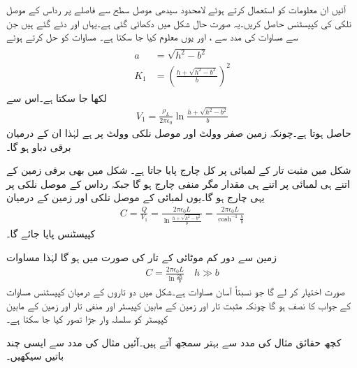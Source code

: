 آئیں ان معلومات کو استعمال کرتے ہوئے لامحدود سیدھی موصل سطح  سے  فاصلے پر  رداس کے موصل نلکی کی کپیسٹنس حاصل کریں۔یہ صورت حال شکل  میں دکھائی گئی ہے۔یہاں  اور  دئے گئے ہیں جن سے مساوات  کی مدد سے ،  اور یوں  معلوم کیا جا سکتا ہے۔ مساوات  کو حل کرتے ہوئے
\begin{gather}
\begin{aligned}\label{مساوات_کپیسٹر_موصل_نلکی_زمین_متغیرات}
a&=\sqrt{h^2-b^2}\\
K_1&=\left(\frac{h+\sqrt{h^2-b^2}}{b}\right)^2
\end{aligned}
\end{gather} 
لکھا جا سکتا ہے۔اس سے
\begin{align*}
V_1=\frac{\rho_L}{2\pi\epsilon_0} \ln \frac{h+\sqrt{h^2-b^2}}{b}
\end{align*}
حاصل ہوتا ہے۔چونکہ زمین صفر وولٹ اور موصل نلکی  وولٹ پر ہے لہٰذا ان کے درمیان  برقی دباو ہو گا۔

شکل  میں مثبت تار کے  لمبائی پر کل چارج  پایا جاتا ہے۔ شکل   میں بھی برقی زمین کے اتنے ہی لمبائی پر اتنے ہی مقدار مگر منفی چارج ہو گا جبکہ  رداس کے موصل نلکی پر یہی  چارج ہو گا۔یوں  لمبائی کے موصل نلکی اور زمین کے درمیان
\begin{align}\label{مساوات_کپیسٹر_نلکی_زمین_کپیسٹنس}
C=\frac{Q}{V_1}=\frac{2\pi\epsilon_0 L}{ \ln \frac{h+\sqrt{h^2-b^2}}{b}}=\frac{2\pi\epsilon_0 L}{\cosh^{-1} \frac{h}{b}}
\end{align}
کپیسٹنس پایا جائے گا۔

زمین سے دور کم موٹائی کے تار کی صورت میں  ہو گا لہٰذا مساوات 
\begin{align}\label{مساوات_کپیسٹر_نلکی_زمین_کپیسٹنس_ب}
C=\frac{2\pi\epsilon_0 L}{ \ln \frac{2h}{b}} \quad{h \gg b}
\end{align}
صورت اختیار کر لے گا جو نسبتاً آسان مساوات ہے۔شکل  میں دو تاروں کے درمیان کپیسٹنس مساوات  کے جواب کا نصف ہو گا چونکہ مثبت تار اور زمین کے مابین کپیسٹر اور منفی تار اور زمین کے مابین کپیسٹر کو سلسلہ وار جڑا تصور کیا جا سکتا ہے۔   

کچھ حقائق مثال کی مدد سے بہتر سمجھ آتے ہیں۔آئیں مثال  کی مدد سے ایسی چند باتیں سیکھیں۔

